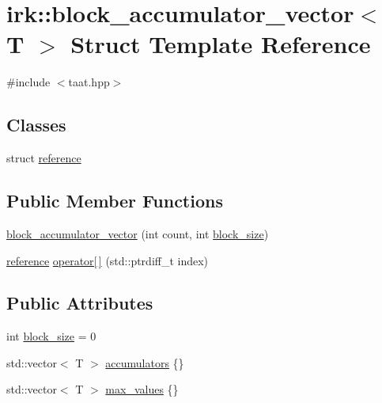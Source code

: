 \hypertarget{structirk_1_1block__accumulator__vector}{}\section{irk\+:\+:block\+\_\+accumulator\+\_\+vector$<$ T $>$ Struct Template Reference}
\label{structirk_1_1block__accumulator__vector}


{\ttfamily \#include $<$taat.\+hpp$>$}

\subsection*{Classes}
\begin{DoxyCompactItemize}
\item 
struct \mbox{\hyperlink{structirk_1_1block__accumulator__vector_1_1reference}{reference}}
\end{DoxyCompactItemize}
\subsection*{Public Member Functions}
\begin{DoxyCompactItemize}
\item 
\mbox{\hyperlink{structirk_1_1block__accumulator__vector_adb288a669ee2b526f19479fd5702bd8d}{block\+\_\+accumulator\+\_\+vector}} (int count, int \mbox{\hyperlink{structirk_1_1block__accumulator__vector_a4465eab1938c5f607b647e6042fe66c8}{block\+\_\+size}})
\item 
\mbox{\hyperlink{structirk_1_1block__accumulator__vector_1_1reference}{reference}} \mbox{\hyperlink{structirk_1_1block__accumulator__vector_a307fe30226bc7fc0952352f95cd11f03}{operator\mbox{[}$\,$\mbox{]}}} (std\+::ptrdiff\+\_\+t index)
\end{DoxyCompactItemize}
\subsection*{Public Attributes}
\begin{DoxyCompactItemize}
\item 
int \mbox{\hyperlink{structirk_1_1block__accumulator__vector_a4465eab1938c5f607b647e6042fe66c8}{block\+\_\+size}} = 0
\item 
std\+::vector$<$ T $>$ \mbox{\hyperlink{structirk_1_1block__accumulator__vector_af19b689aa80c58cbcc788fc5b11d0de1}{accumulators}} \{\}
\item 
std\+::vector$<$ T $>$ \mbox{\hyperlink{structirk_1_1block__accumulator__vector_a63e09374714113ce080afdc39aaa582c}{max\+\_\+values}} \{\}
\end{DoxyCompactItemize}


